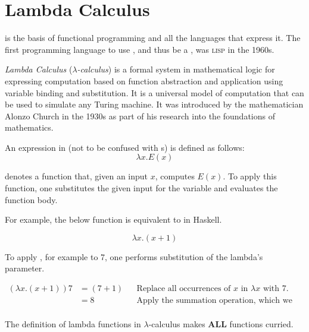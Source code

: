 \section{Lambda Calculus}\label{sec:Lambda_Calculus}
 is the basis of functional programming and all the languages that express it.
The first programming language to use , and thus be a , was \textsc{lisp} in the 1960s.

\begin{definition}\label{def:Lambda_Calculus}
  \emph{Lambda Calculus} (\emph{$\lambda$-calculus}) is a formal system in mathematical logic for expressing computation based on function abstraction and application using variable binding and substitution.
  It is a universal model of computation that can be used to simulate any Turing machine.
  It was introduced by the mathematician Alonzo Church in the 1930s as part of his research into the foundations of mathematics.
\end{definition}

An expression in  (not to be confused with s) is defined as follows:
\begin{equation}\label{eq:Basic_Lambda_Function}
  \lambda x. E(x)
\end{equation}

 denotes a function that, given an input $x$, computes $E(x)$.
To apply this function, one substitutes the given input for the variable and evaluates the function body.

For example, the below function is equivalent to  in Haskell.

\begin{equation}\label{eq:Succ_Lambda_Function}
  \lambda x.(x+1)
\end{equation}

To apply , for example to 7, one performs substitution of the lambda's parameter.

\begin{align*}
(\lambda x.(x+1))7 &= (7+1) && \text{Replace all occurrences of $x$ in $\lambda x$ with 7.} \\
                   &= 8 && \text{Apply the summation operation, which we assume to be primitive.} \\
\end{align*}

\begin{remark*}
  The definition of lambda functions in $\lambda$-calculus makes \textbf{ALL} functions curried.
\end{remark*}

